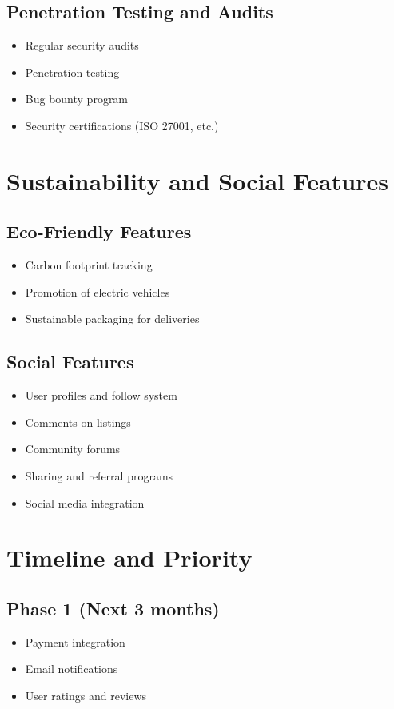 \subsection{Penetration Testing and Audits}

\begin{itemize}
    \item Regular security audits
    \item Penetration testing
    \item Bug bounty program
    \item Security certifications (ISO 27001, etc.)
\end{itemize}

\section{Sustainability and Social Features}

\subsection{Eco-Friendly Features}

\begin{itemize}
    \item Carbon footprint tracking
    \item Promotion of electric vehicles
    \item Sustainable packaging for deliveries
\end{itemize}

\subsection{Social Features}

\begin{itemize}
    \item User profiles and follow system
    \item Comments on listings
    \item Community forums
    \item Sharing and referral programs
    \item Social media integration
\end{itemize}

\section{Timeline and Priority}

\subsection{Phase 1 (Next 3 months)}
\begin{itemize}
    \item Payment integration
    \item Email notifications
    \item User ratings and reviews
\end{itemize}

